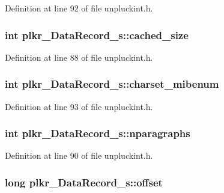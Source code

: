 Definition at line 92 of file unpluckint.\+h.

\hypertarget{structplkr__DataRecord__s_a78134dc5aa0e23c86e5299ea6ca9f4b2}{
\subsubsection[{cached\+\_\+size}]{\setlength{\rightskip}{0pt plus 5cm}int plkr\+\_\+\+Data\+Record\+\_\+s\+::cached\+\_\+size}}\label{structplkr__DataRecord__s_a78134dc5aa0e23c86e5299ea6ca9f4b2}


Definition at line 88 of file unpluckint.\+h.

\hypertarget{structplkr__DataRecord__s_aeb1516d92695e1a446bef9e5385a0b72}{
\subsubsection[{charset\+\_\+mibenum}]{\setlength{\rightskip}{0pt plus 5cm}int plkr\+\_\+\+Data\+Record\+\_\+s\+::charset\+\_\+mibenum}}\label{structplkr__DataRecord__s_aeb1516d92695e1a446bef9e5385a0b72}


Definition at line 93 of file unpluckint.\+h.

\hypertarget{structplkr__DataRecord__s_a13979f89593b2b7c5eff61004025cacd}{
\subsubsection[{nparagraphs}]{\setlength{\rightskip}{0pt plus 5cm}int plkr\+\_\+\+Data\+Record\+\_\+s\+::nparagraphs}}\label{structplkr__DataRecord__s_a13979f89593b2b7c5eff61004025cacd}


Definition at line 90 of file unpluckint.\+h.

\hypertarget{structplkr__DataRecord__s_a913726cb8132eca067843510b8ff0b95}{
\subsubsection[{offset}]{\setlength{\rightskip}{0pt plus 5cm}long plkr\+\_\+\+Data\+Record\+\_\+s\+::offset}}\label{structplkr__DataRecord__s_a913726cb8132eca067843510b8ff0b95}


